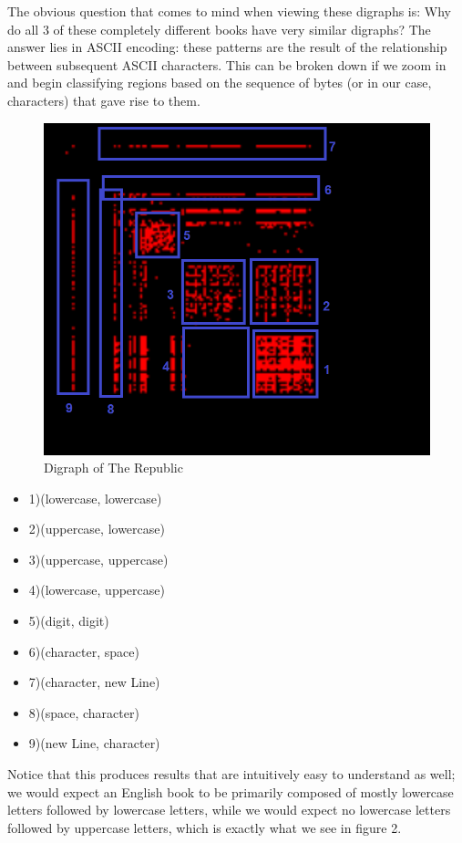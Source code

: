 \documentclass[12pt,a4paper]{article}
\begin{document}
\pagebreak
The obvious question that comes to mind when viewing these digraphs is: Why do all 3 of these completely different books have very similar digraphs? The answer lies in ASCII encoding: these patterns are the result of the relationship between subsequent ASCII characters. This can be broken down if we zoom in and begin classifying regions based on the sequence of bytes (or in our case, characters) that gave rise to them. 


\begin{minipage}{0.6\textwidth}
	\begin{figure}[H]
		\includegraphics[scale=0.45]{images/RepublicZoom.png} 
		\caption{Digraph of The Republic}
	\end{figure}
\end{minipage} \hfill
\begin{minipage}{0.45\textwidth}
	\begin{itemize}
		\item 1)(lowercase, lowercase)
		\item 2)(uppercase, lowercase)
		\item 3)(uppercase, uppercase)
		\item 4)(lowercase, uppercase)
		\item 5)(digit, digit)
		\item 6)(character, space)
		\item 7)(character, new Line)
		\item 8)(space, character)
		\item 9)(new Line, character)
	\end{itemize}
\end{minipage}
\linebreak\linebreak\linebreak
Notice that this produces results that are intuitively easy to understand as well; we would expect an English book to be primarily composed of mostly lowercase letters followed by lowercase letters, while we would expect no lowercase letters followed by uppercase letters, which is exactly what we see in figure 2. 
\end{document}
